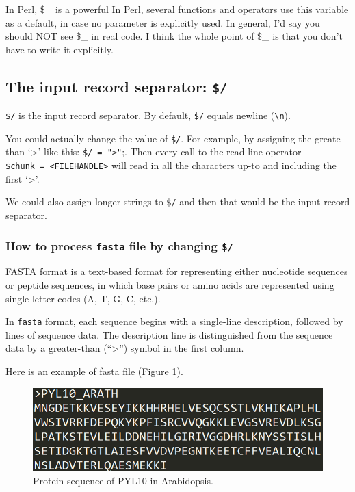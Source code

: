 \documentclass[]{book}
\begin{document}
In Perl, \$\_ is a powerful
In Perl, several functions and operators use this variable as a default, in case no parameter is explicitly used. In general, I'd say you should NOT see \$\_ in real code. I think the whole point of \$\_ is that you don't have to write it explicitly.

\hypertarget{the-input-record-separator}{%
\subsection{\texorpdfstring{The input record separator: \texttt{\$/}}{The input record separator: \$/}}\label{the-input-record-separator}}

\texttt{\$/} is the input record separator. By default, \texttt{\$/} equals newline (\texttt{\textbackslash{}n}).

You could actually change the value of \texttt{\$/}. For example, by assigning the greate-than `\textgreater{}' like this: \texttt{\$/\ =\ "\textgreater{}"};. Then every call to the read-line operator \texttt{\$chunk\ =\ \textless{}FILEHANDLE\textgreater{}} will read in all the characters up-to and including the first `\textgreater{}'.

We could also assign longer strings to \texttt{\$/} and then that would be the input record separator.

\hypertarget{how-to-process-fasta-file-by-changing}{%
\subsubsection{\texorpdfstring{How to process \texttt{fasta} file by changing \texttt{\$/}}{How to process fasta file by changing \$/}}\label{how-to-process-fasta-file-by-changing}}

FASTA format is a text-based format for representing either nucleotide sequences or peptide sequences, in which base pairs or amino acids are represented using single-letter codes (A, T, G, C, etc.).

In \texttt{fasta} format, each sequence begins with a single-line description, followed by lines of sequence data. The description line is distinguished from the sequence data by a greater-than (``\textgreater{}'') symbol in the first column.

Here is an example of fasta file (Figure \ref{fig:fastaPYL}).



\begin{figure}
\centering
\includegraphics{figures/fasta_pyl10_ara.png}
\caption{\label{fig:fastaPYL}Protein sequence of PYL10 in Arabidopsis.}
\end{figure}
\end{document}
